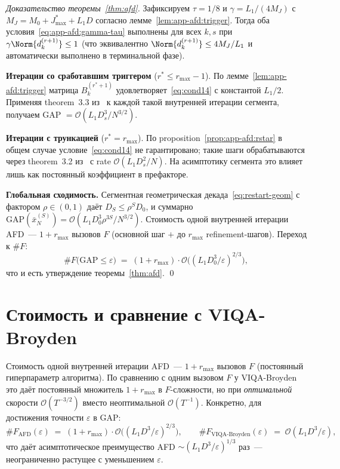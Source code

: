 \begin{proof}[Доказательство теоремы~\ref{thm:afd}]
Зафиксируем $\tau = 1/8$ и $\gamma = L_1/(4 M_J)$ с
$M_J = M_0 + J^{*}_{\max} + L_1 D$ согласно
лемме~\ref{lem:app-afd:trigger}. Тогда оба
условия~\eqref{eq:app-afd:gamma-tau} выполнены для всех $k, s$ при
$\gamma\Norm{d^{(r+1)}_k} \le 1$ (что эквивалентно $\Norm{d^{(r+1)}_k}
\le 4 M_J/L_1$ и автоматически выполнено в терминальной фазе).

\textbf{Итерации со сработавшим триггером} ($r^{*} \le r_{\max}-1$).
По лемме~\ref{lem:app-afd:trigger} матрица $B_k^{(r^{*}+1)}$
удовлетворяет~\eqref{eq:cond14} с константой $L_1/2$. Применяя
theorem~3.3 из~\cite{Agafonov2024VIJI} к каждой такой внутренней итерации
сегмента, получаем GAP $= \mathcal O(L_1 D_s^{3} / N^{3/2})$.

\textbf{Итерации с трункацией} ($r^{*} = r_{\max}$).
По proposition~\ref{prop:app-afd:rstar} в общем случае условие~\eqref{eq:cond14}
не гарантировано; такие шаги обрабатываются через theorem~3.2
из~\cite{Agafonov2024VIJI} с rate $\mathcal O(L_1 D_s^{2}/N)$. На асимптотику
сегмента это влияет лишь как постоянный коэффициент в префакторе.

\textbf{Глобальная сходимость.}
Сегментная геометрическая декада~\eqref{eq:restart-geom} с фактором
$\rho \in (0, 1)$ даёт $D_S \le \rho^S D_0$, и суммарно
$\mathrm{GAP}(\bar x^{(S)}_N) = \mathcal O(L_1 D_0^{3} \rho^{3S} / N^{3/2})$.
Стоимость одной внутренней итерации AFD~--- $1 + r_{\max}$ вызовов $F$
(основной шаг $+$ до $r_{\max}$ refinement-шагов). Переход к $\#F$:
\[
\#F\bigl(\mathrm{GAP} \le \varepsilon\bigr)
\;=\;
(1+r_{\max})\cdot\mathcal O\!\bigl((L_1 D_0^{3}/\varepsilon)^{2/3}\bigr),
\]
что и есть утверждение теоремы~\ref{thm:afd}. \qed
\end{proof}

\section{Стоимость и сравнение с VIQA-Broyden}
\label{sec:app-afd:cost}

Стоимость одной внутренней итерации AFD~--- $1 + r_{\max}$ вызовов $F$
(постоянный гиперпараметр алгоритма). По сравнению с одним вызовом $F$
у VIQA-Broyden это даёт постоянный множитель $1+r_{\max}$ в $F$-сложности,
но при \emph{оптимальной} скорости $\mathcal O(T^{-3/2})$ вместо
неоптимальной $\mathcal O(T^{-1})$. Конкретно, для достижения точности
$\varepsilon$ в GAP:
\[
\#F_{\mathrm{AFD}}(\varepsilon)
\;=\;
(1+r_{\max})\cdot \mathcal O\bigl((L_1 D^{3}/\varepsilon)^{2/3}\bigr),
\qquad
\#F_{\mathrm{VIQA\text{-}Broyden}}(\varepsilon)
\;=\;
\mathcal O(L_1 D^{3}/\varepsilon),
\]
что даёт асимптотическое преимущество AFD $\sim (L_1 D^{3}/\varepsilon)^{1/3}$
раз~--- неограниченно растущее с уменьшением $\varepsilon$.

